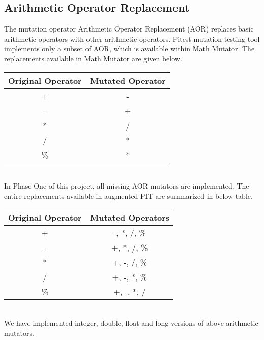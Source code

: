 \subsection{Arithmetic Operator Replacement}
The mutation operator Arithmetic Operator Replacement (AOR) replaces basic arithmetic operators with other arithmetic operators. Pitest mutation testing tool implements only a subset of AOR, which is available within Math Mutator. The replacements available in Math Mutator are given below.\newline

\begin{tabular}{|c|c|}
	\hline
	Original Operator & Mutated Operator\\
	\hline
    + & -\\
	\hline
    - & +\\
	\hline
    * & /\\
	\hline
    / & *\\
	\hline
    \% & *\\
	\hline
\end{tabular}\\


In Phase One of this project, all missing AOR mutators are implemented. The entire replacements available in augmented PIT are summarized in below table.\\

\begin{tabular}{|c|c|}
	\hline
	Original Operator & Mutated Operators\\
	\hline
    + & -, *, /, \% \\
	\hline
    - & +, *, /, \%\\
	\hline
    * & +, -, /, \%\\
	\hline
    / & +, -, *, \%\\
	\hline
    \% & +, -, *, /\\
	\hline
\end{tabular}\\

We have implemented integer, double, float and long versions of above arithmetic mutators.


